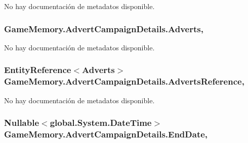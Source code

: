 No hay documentación de metadatos disponible. 

\hypertarget{class_game_memory_1_1_advert_campaign_details_a9abbe4e8fd98bab4accdc80aa19afbc9}{
\subsubsection[{Adverts}]{ Game\-Memory.\-Advert\-Campaign\-Details.\-Adverts\hspace{0.3cm}{\ttfamily [get]}, {\ttfamily [set]}}}\label{class_game_memory_1_1_advert_campaign_details_a9abbe4e8fd98bab4accdc80aa19afbc9}


No hay documentación de metadatos disponible. 

\hypertarget{class_game_memory_1_1_advert_campaign_details_ac0bd4032d1453cc94b31066b61da0e3c}{
\subsubsection[{Adverts\-Reference}]{\setlength{\rightskip}{0pt plus 5cm}Entity\-Reference$<${\bf Adverts}$>$ Game\-Memory.\-Advert\-Campaign\-Details.\-Adverts\-Reference\hspace{0.3cm}{\ttfamily [get]}, {\ttfamily [set]}}}\label{class_game_memory_1_1_advert_campaign_details_ac0bd4032d1453cc94b31066b61da0e3c}


No hay documentación de metadatos disponible. 

\hypertarget{class_game_memory_1_1_advert_campaign_details_a22a86c021a8119defac4074a13bbb1e3}{
\subsubsection[{End\-Date}]{\setlength{\rightskip}{0pt plus 5cm}Nullable$<$global.\-System.\-Date\-Time$>$ Game\-Memory.\-Advert\-Campaign\-Details.\-End\-Date\hspace{0.3cm}{\ttfamily [get]}, {\ttfamily [set]}}}\label{class_game_memory_1_1_advert_campaign_details_a22a86c021a8119defac4074a13bbb1e3}


